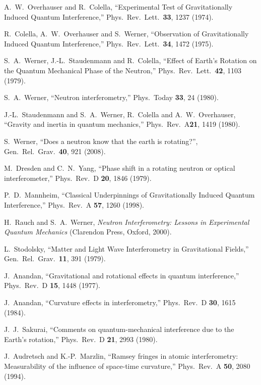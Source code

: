 \documentclass[twocolumn,reprint,amsmath,amssymb]{revtex4}
\begin{document}
\begin{thebibliography}{}



A.\ W.\ Overhauser and R.\ Colella, 
``Experimental Test of Gravitationally Induced Quantum Interference,'' 
Phys.\ Rev.\ Lett.\ {\bf 33}, 1237 (1974). 

R.\ Colella, A.\ W.\ Overhauser and S.\ Werner, 
``Observation of Gravitationally Induced Quantum Interference,'' 
Phys.\ Rev.\ Lett.\ {\bf 34}, 1472 (1975). 

S.\ A.\ Werner, J.-L.\ Staudenmann and R.\ Colella, 
``Effect of Earth's Rotation on the Quantum Mechanical Phase of the Neutron,''
Phys.\ Rev.\ Lett.\ {\bf 42}, 1103 (1979).

S.\ A.\ Werner, ``Neutron interferometry,'' Phys.\ Today {\bf 33}, 24 (1980).

J.-L.\ Staudenmann and S.\ A.\ Werner, R.\ Colella and A.\ W.\ Overhauser,
``Gravity and inertia in quantum mechanics,'' Phys.\ Rev.\ A{\bf 21}, 1419 (1980).

S.\ Werner,
``Does a neutron know that the earth is rotating?'',
Gen.\ Rel.\ Grav.\ {\bf 40}, 921 (2008).

M.\ Dresden and C.\ N.\ Yang, 
``Phase shift in a rotating neutron or optical interferometer,''
Phys.\ Rev.\ D {\bf 20}, 1846 (1979).

P.\ D.\ Mannheim, 
``Classical Underpinnings of Gravitationally Induced Quantum Interference,'' 
Phys.\ Rev.\ A {\bf 57}, 1260 (1998).

H.\ Rauch and S.\ A.\ Werner, {\it Neutron Interferometry: Lessons in Experimental Quantum Mechanics} (Clarendon Press, Oxford, 2000). 

L.\ Stodolsky, 
``Matter and Light Wave Interferometry in Gravitational Fields,''
Gen.\ Rel.\ Grav.\ {\bf 11}, 391 (1979).

J.\ Anandan, ``Gravitational and rotational effects in quantum interference,''
Phys.\ Rev.\ D {\bf 15}, 1448 (1977).

J.\ Anandan, ``Curvature effects in interferometry,''
Phys.\ Rev.\ D {\bf 30}, 1615 (1984).

J.\ J.\ Sakurai, 
``Comments on quantum-mechanical interference due to the Earth's rotation,''
Phys.\ Rev.\ D {\bf 21}, 2993 (1980).

J.\ Audretsch and K.-P.\ Marzlin, 
``Ramsey fringes in atomic interferometry: Measurability of the influence 
of space-time curvature,''
Phys.\ Rev.\ A {\bf 50}, 2080 (1994). 


\end{thebibliography}
\end{document}
